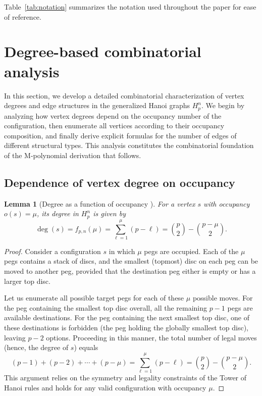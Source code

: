\documentclass[letterpaper,12pt]{article}
\newtheorem{lemma}{Lemma}
\begin{document}
 
Table~\ref{tab:notation} summarizes the notation used throughout the paper for ease of reference.
 


\section{Degree-based combinatorial analysis}\label{sec:analysis}

In this section, we develop a detailed combinatorial characterization of vertex degrees and edge structures in the generalized Hanoi graphs \(H_p^n\).  
We begin by analyzing how vertex degrees depend on the occupancy number of the configuration, then enumerate all vertices according to their occupancy composition, and finally derive explicit formulas for the number of edges of different structural types.  
This analysis constitutes the combinatorial foundation of the M-polynomial derivation that follows.


\subsection{Dependence of vertex degree on occupancy}





\begin{lemma}[Degree as a function of occupancy \cite{HINZ20121521,Arett01062010}]
\label{lem:deg_occ}
For a vertex \(s\) with occupancy \(o(s)=\mu\), its degree in \(H_p^n\) is given by
\begin{equation}
\label{eq:f_pn}
\deg(s) = f_{p,n}(\mu)
  = \sum_{\ell=1}^{\mu}(p-\ell)
  = \binom{p}{2}-\binom{p-\mu}{2}.
\end{equation}
\end{lemma}

\begin{proof}
Consider a configuration \(s\) in which \(\mu\) pegs are occupied.  
Each of the \(\mu\) pegs contains a stack of discs, and the smallest (topmost) disc on each peg can be moved to another peg, provided that the destination peg either is empty or has a larger top disc.

Let us enumerate all possible target pegs for each of these \(\mu\) possible moves.  
For the peg containing the smallest top disc overall, all the remaining \(p-1\) pegs are available destinations.  
For the peg containing the next smallest top disc, one of these destinations is forbidden (the peg holding the globally smallest top disc), leaving \(p-2\) options.  
Proceeding in this manner, the total number of legal moves (hence, the degree of \(s\)) equals
\[
(p-1)+(p-2)+\cdots+(p-\mu)
 = \sum_{\ell=1}^{\mu}(p-\ell)
 = \binom{p}{2}-\binom{p-\mu}{2}.
\]
This argument relies on the symmetry and legality constraints of the Tower of Hanoi rules and holds for any valid configuration with occupancy \(\mu\).\qedhere
\end{proof}
\end{document}
